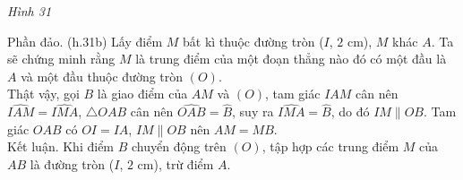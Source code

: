 \begin{vd}
{\begin{center}
\textit{Hình 31}
	\end{center}
	Phần đảo. (h.31b) Lấy điểm $M$ bất kì thuộc đường tròn ($I$, $2$ cm), $M$ khác $A$. Ta sẽ chứng minh rằng $M$ là trung điểm của một đoạn thẳng nào đó có một đầu là $A$ và một đầu thuộc đường tròn $(O)$. \\
	Thật vậy, gọi $B$ là giao điểm của $AM$ và $(O)$, tam giác $IAM$ cân nên $\widehat{IAM} = \widehat{IMA}$, $\triangle{OAB}$ cân nên $\widehat{OAB} = \widehat{B}$, suy ra $\widehat{IMA} = \widehat{B}$, do đó $IM \parallel OB$. Tam giác $OAB$ có $OI = IA$, $IM \parallel OB$ nên $AM = MB$. \\
	Kết luận. Khi điểm $B$ chuyển động trên $(O)$, tập hợp các trung điểm $M$ của $AB$ là đường tròn ($I$, $2$ cm), trừ điểm $A$.
	}
	\end{vd}

